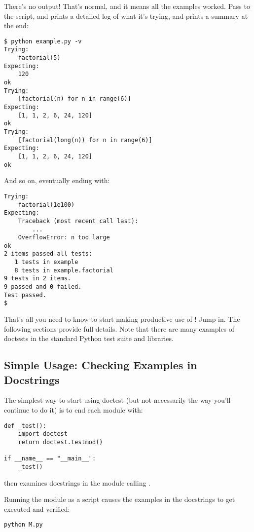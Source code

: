 There's no output!  That's normal, and it means all the examples
worked.  Pass  to the script, and 
prints a detailed log of what it's trying, and prints a summary at the
end:

\begin{verbatim}
$ python example.py -v
Trying:
    factorial(5)
Expecting:
    120
ok
Trying:
    [factorial(n) for n in range(6)]
Expecting:
    [1, 1, 2, 6, 24, 120]
ok
Trying:
    [factorial(long(n)) for n in range(6)]
Expecting:
    [1, 1, 2, 6, 24, 120]
ok
\end{verbatim}

And so on, eventually ending with:

\begin{verbatim}
Trying:
    factorial(1e100)
Expecting:
    Traceback (most recent call last):
        ...
    OverflowError: n too large
ok
2 items passed all tests:
   1 tests in example
   8 tests in example.factorial
9 tests in 2 items.
9 passed and 0 failed.
Test passed.
$
\end{verbatim}

That's all you need to know to start making productive use of
!  Jump in.  The following sections provide full
details.  Note that there are many examples of doctests in
the standard Python test suite and libraries.

\subsection{Simple Usage: Checking Examples in 
            Docstrings\label{doctest-simple-testmod}}

The simplest way to start using doctest (but not necessarily the way
you'll continue to do it) is to end each module  with:

\begin{verbatim}
def _test():
    import doctest
    return doctest.testmod()

if __name__ == "__main__":
    _test()
\end{verbatim}

 then examines docstrings in the module calling
.

Running the module as a script causes the examples in the docstrings
to get executed and verified:

\begin{verbatim}
python M.py
\end{verbatim}

